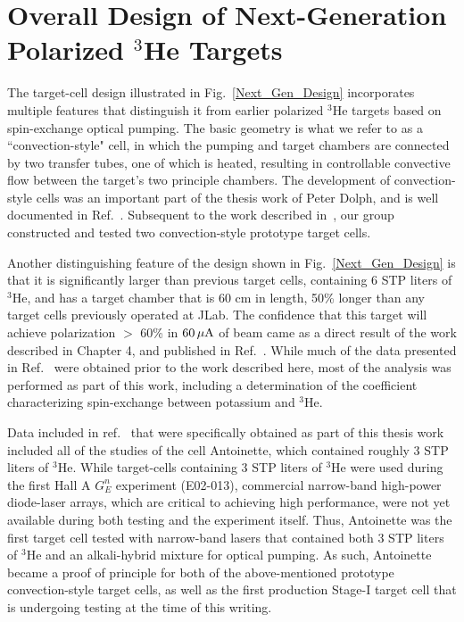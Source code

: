 \section{Overall Design of Next-Generation Polarized $^3$He Targets}

The target-cell design illustrated in Fig.~\ref{Next_Gen_Design} incorporates multiple features that distinguish it from earlier polarized $^3$He targets based on spin-exchange optical pumping. The basic geometry is what we refer to as a ``convection-style" cell, in which the pumping and target chambers are connected
by two transfer tubes, one of which is heated, resulting in controllable convective flow between the target's two principle chambers. The development of convection-style cells was an important part of the thesis work of Peter Dolph, and is well documented in Ref.~\cite{PhysRevC.84.065201}. Subsequent to the work described in~\cite{PhysRevC.84.065201}, our group constructed and tested two convection-style prototype target cells. 

Another distinguishing feature of the design shown in Fig.~\ref{Next_Gen_Design} is that it is significantly larger than previous target cells, containing 6 STP liters of $^3$He, and has a target chamber that is 60 cm in length, 50\% longer than any target cells previously operated at JLab.  The confidence that this target will achieve polarization $>$ 60\% in ${\rm 60\,\mu A}$ of beam came as a direct result of the work described in Chapter 4, and published in Ref.~\cite{PhysRevC.91.055205}. While much of the data presented in Ref.~\cite{PhysRevC.91.055205} were obtained prior to the work described here, most of the analysis was performed as part of this work, including a determination of the coefficient characterizing spin-exchange between potassium and $^3$He.  

Data included in ref.~\cite{PhysRevC.91.055205} that were specifically obtained as part of this thesis work included all of the studies of the cell Antoinette, which contained roughly 3 STP liters of $^3$He. While target-cells containing 3 STP liters of $^3$He were used during the first Hall A $G_E^n$ experiment (E02-013), commercial narrow-band high-power diode-laser arrays, which are critical to achieving high performance, were not yet available during both testing and the experiment itself. Thus, Antoinette was the first target cell tested with narrow-band lasers that contained both 3 STP liters of $^3$He and an alkali-hybrid mixture for optical pumping. As such, Antoinette became a proof of principle for both of the above-mentioned prototype convection-style target cells, as well as the first production Stage-I target cell that is undergoing testing at the time of this writing.

